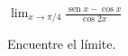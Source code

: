 \item $\displaystyle \lim_{x \to \pi/4} \frac{\operatorname{sen} x - \cos x}{\cos 2x}$
\par
Encuentre el límite.
